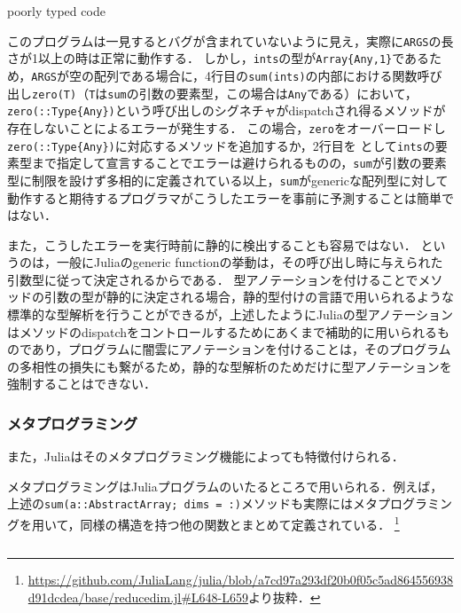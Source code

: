 \begin{listing}[ht]
  \inputminted[frame=lines]{julia}{src/parse_sum.jl}
  \caption{poorly typed code}
  \label{lst:target1}
\end{listing}

このプログラムは一見するとバグが含まれていないように見え，実際に\verb|ARGS|の長さが1以上の時は正常に動作する．
しかし，\verb|ints|の型が\verb|Array{Any,1}|であるため，\verb|ARGS|が空の配列である場合に，4行目の\verb|sum(ints)|の内部における関数呼び出し\verb|zero(T)|（\verb|T|は\verb|sum|の引数の要素型，この場合は\verb|Any|である）において， \verb|zero(::Type{Any})|という呼び出しのシグネチャがdispatchされ得るメソッドが存在しないことによるエラーが発生する．
この場合，\verb|zero|をオーバーロードし\verb|zero(::Type{Any})|に対応するメソッドを追加するか，2行目を  として\verb|ints|の要素型まで指定して宣言することでエラーは避けられるものの，\verb|sum|が引数の要素型に制限を設けず多相的に定義されている以上，\verb|sum|がgenericな配列型に対して動作すると期待するプログラマがこうしたエラーを事前に予測することは簡単ではない．

また，こうしたエラーを実行時前に静的に検出することも容易ではない．
というのは，一般にJuliaのgeneric functionの挙動は，その呼び出し時に与えられた引数型に従って決定されるからである．
型アノテーションを付けることでメソッドの引数の型が静的に決定される場合，静的型付けの言語で用いられるような標準的な型解析を行うことができるが，上述したようにJuliaの型アノテーションはメソッドのdispatchをコントロールするためにあくまで補助的に用いられるものであり，プログラムに闇雲にアノテーションを付けることは，そのプログラムの多相性の損失にも繋がるため，静的な型解析のためだけに型アノテーションを強制することはできない．

\subsubsection{メタプログラミング}

また，Juliaはそのメタプログラミング機能によっても特徴付けられる．

メタプログラミングはJuliaプログラムのいたるところで用いられる．例えば，上述の\verb|sum(a::AbstractArray; dims = :)|メソッドも実際にはメタプログラミングを用いて，同様の構造を持つ他の関数とまとめて定義されている．
\footnote{
  \url{https://github.com/JuliaLang/julia/blob/a7cd97a293df20b0f05c5ad864556938d91dcdea/base/reducedim.jl\#L648-L659}より抜粋．
}

\inputminted[frame=lines, firstline=3, lastline=12, breaklines]{julia}{src/sums_def.jl}

